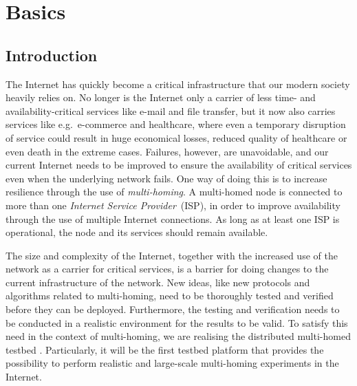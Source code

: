
\chapter{Basics}
\label{cha:Basics}

\section{Introduction}
\label{sec:Introduction}

The Internet has quickly become a critical infrastructure that our modern society heavily relies on. No longer is the Internet only a carrier of less time- and availability-critical services like e-mail and file transfer, but it now also carries services like e.g.\ e-commerce and healthcare, where even a temporary disruption of service could result in huge economical losses, reduced quality of healthcare or even death in the extreme cases. Failures, however, are unavoidable, and our current Internet needs to be improved to ensure the availability of critical services even when the underlying network fails. One way of doing this is to increase resilience through the use of \emph{multi-homing}. A multi-homed node is connected to more than one \emph{Internet Service Provider}~(ISP), in order to improve availability through the use of multiple Internet connections. As long as at least one ISP is operational, the node and its services should remain available.

The size and complexity of the Internet, together with the increased use of the network as a carrier for critical services, is a barrier for doing changes to the current infrastructure of the network. New ideas, like new protocols and algorithms related to multi-homing, need to be thoroughly tested and verified before they can be deployed. Furthermore, the testing and verification needs to be conducted in a realistic environment for the results to be valid. To satisfy this need in the context of multi-homing, we are realising the distributed multi-homed testbed . Particularly, it will be the first testbed platform that provides the possibility to perform realistic and large-scale multi-homing experiments in the Internet.

